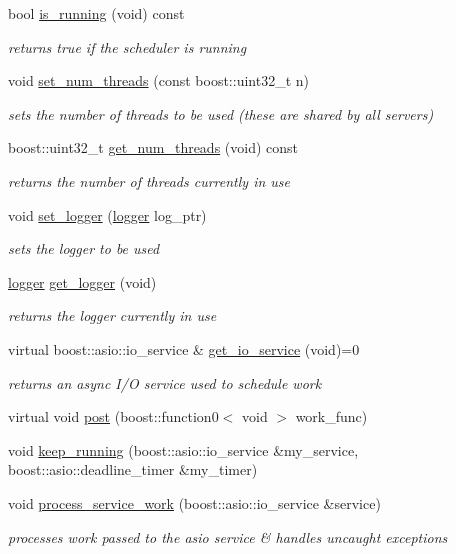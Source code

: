 \begin{DoxyCompactItemize}
bool \hyperlink{classpion_1_1scheduler_a83d328c2947c65e77a603a4127442eb4}{is\-\_\-running} (void) const 
\begin{DoxyCompactList}\small\item\em returns true if the scheduler is running \end{DoxyCompactList}\item 
void \hyperlink{classpion_1_1scheduler_acd1c3b2393354a9db7a4dba6aa028b83}{set\-\_\-num\-\_\-threads} (const boost\-::uint32\-\_\-t n)
\begin{DoxyCompactList}\small\item\em sets the number of threads to be used (these are shared by all servers) \end{DoxyCompactList}\item 
boost\-::uint32\-\_\-t \hyperlink{classpion_1_1scheduler_af9b6fe7245c024bd18e3f245993cd965}{get\-\_\-num\-\_\-threads} (void) const 
\begin{DoxyCompactList}\small\item\em returns the number of threads currently in use \end{DoxyCompactList}\item 
void \hyperlink{classpion_1_1scheduler_a3842b00e98a84105cbeb8a1786c9e353}{set\-\_\-logger} (\hyperlink{structpion_1_1logger}{logger} log\-\_\-ptr)
\begin{DoxyCompactList}\small\item\em sets the logger to be used \end{DoxyCompactList}\item 
\hyperlink{structpion_1_1logger}{logger} \hyperlink{classpion_1_1scheduler_a3fba5b7cb9d99d49394241e386e5f581}{get\-\_\-logger} (void)
\begin{DoxyCompactList}\small\item\em returns the logger currently in use \end{DoxyCompactList}\item 
virtual boost\-::asio\-::io\-\_\-service \& \hyperlink{classpion_1_1scheduler_a037e0ee2c2c83b7002180a4656ccbbfa}{get\-\_\-io\-\_\-service} (void)=0
\begin{DoxyCompactList}\small\item\em returns an async I/\-O service used to schedule work \end{DoxyCompactList}\item 
virtual void \hyperlink{classpion_1_1scheduler_aad1b779b29a0dc3b8c2e38e5e67263bb}{post} (boost\-::function0$<$ void $>$ work\-\_\-func)
\item 
void \hyperlink{classpion_1_1scheduler_a8bda557ed5c95e2fbec96e14c793e844}{keep\-\_\-running} (boost\-::asio\-::io\-\_\-service \&my\-\_\-service, boost\-::asio\-::deadline\-\_\-timer \&my\-\_\-timer)
\item 
void \hyperlink{classpion_1_1scheduler_a53cdc5fc1fb829de12cefd4183021d28}{process\-\_\-service\-\_\-work} (boost\-::asio\-::io\-\_\-service \&service)
\begin{DoxyCompactList}\small\item\em processes work passed to the asio service \& handles uncaught exceptions \end{DoxyCompactList}\end{DoxyCompactItemize}
